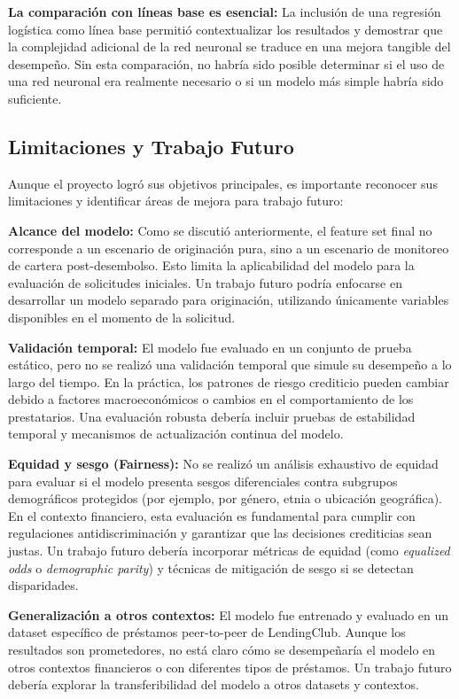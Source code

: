 \documentclass[12pt,a4paper]{article}
\begin{document}
\textbf{La comparación con líneas base es esencial:} La inclusión de una regresión logística como línea base permitió contextualizar los resultados y demostrar que la complejidad adicional de la red neuronal se traduce en una mejora tangible del desempeño. Sin esta comparación, no habría sido posible determinar si el uso de una red neuronal era realmente necesario o si un modelo más simple habría sido suficiente.

\subsection{Limitaciones y Trabajo Futuro}

Aunque el proyecto logró sus objetivos principales, es importante reconocer sus limitaciones y identificar áreas de mejora para trabajo futuro:

\textbf{Alcance del modelo:} Como se discutió anteriormente, el feature set final no corresponde a un escenario de originación pura, sino a un escenario de monitoreo de cartera post-desembolso. Esto limita la aplicabilidad del modelo para la evaluación de solicitudes iniciales. Un trabajo futuro podría enfocarse en desarrollar un modelo separado para originación, utilizando únicamente variables disponibles en el momento de la solicitud.

\textbf{Validación temporal:} El modelo fue evaluado en un conjunto de prueba estático, pero no se realizó una validación temporal que simule su desempeño a lo largo del tiempo. En la práctica, los patrones de riesgo crediticio pueden cambiar debido a factores macroeconómicos o cambios en el comportamiento de los prestatarios. Una evaluación robusta debería incluir pruebas de estabilidad temporal y mecanismos de actualización continua del modelo.

\textbf{Equidad y sesgo (Fairness):} No se realizó un análisis exhaustivo de equidad para evaluar si el modelo presenta sesgos diferenciales contra subgrupos demográficos protegidos (por ejemplo, por género, etnia o ubicación geográfica). En el contexto financiero, esta evaluación es fundamental para cumplir con regulaciones antidiscriminación y garantizar que las decisiones crediticias sean justas. Un trabajo futuro debería incorporar métricas de equidad (como \textit{equalized odds} o \textit{demographic parity}) y técnicas de mitigación de sesgo si se detectan disparidades.

\textbf{Generalización a otros contextos:} El modelo fue entrenado y evaluado en un dataset específico de préstamos peer-to-peer de LendingClub. Aunque los resultados son prometedores, no está claro cómo se desempeñaría el modelo en otros contextos financieros o con diferentes tipos de préstamos. Un trabajo futuro debería explorar la transferibilidad del modelo a otros datasets y contextos.
\end{document}
